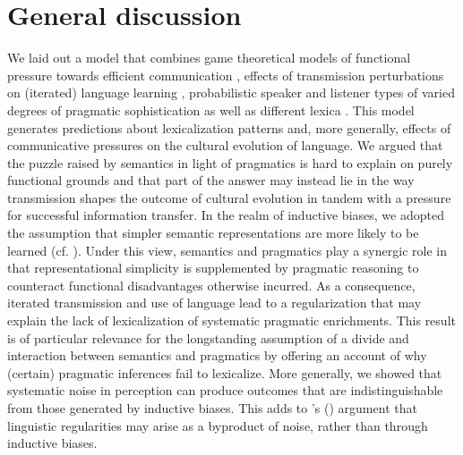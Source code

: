 \documentclass[a4paper]{article}
\newcommand{\citeposs}[2][]{\citeauthor{#2}'s (\citeyear[#1]{#2})}
\begin{document}
\section{General discussion}\label{sec:discussion}
We laid out a model that combines game theoretical models of functional pressure towards efficient communication \citep{nowak+krakauer:1999}, effects of transmission perturbations on (iterated) language learning \citep{griffiths+kalish:2007}, probabilistic speaker and listener types of varied degrees of pragmatic sophistication \citep{frank+goodman:2012, franke+jaeger:2014} as well as different lexica \citep{bergen+etal:2012,bergen+etal:2016}. This model generates predictions about lexicalization patterns and, more generally, effects of communicative pressures on the cultural evolution of language. We argued that the puzzle raised by semantics in light of pragmatics is hard to explain on purely functional grounds and that part of the answer may instead lie in the way transmission shapes the outcome of cultural evolution in tandem with a pressure for successful information transfer. In the realm of inductive biases, we adopted the assumption that simpler semantic representations are more likely to be learned (cf. \citealt{chater+vitanyi:2003}). Under this view, semantics and pragmatics play a synergic role in that representational simplicity is supplemented by pragmatic reasoning to counteract functional disadvantages otherwise incurred. As a consequence, iterated transmission and use of language lead to a regularization that may explain the lack of lexicalization of systematic pragmatic enrichments. This result is of particular relevance for the longstanding assumption of a divide and interaction between semantics and pragmatics by offering an account of why (certain) pragmatic inferences fail to lexicalize. More generally, we showed that systematic noise in perception can produce outcomes that are indistinguishable from those generated by inductive biases. This adds to \citeposs{franke+correia:toappear} argument that linguistic regularities may arise as a byproduct of noise, rather than through inductive biases.
\end{document}

